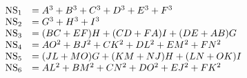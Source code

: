 \begin{equation*}
  \begin{array}{rl}
{\rm NS}_1 &= A^3 + B^3 +C^3 +D^3 + E^3 + F^3 \\
{\rm NS}_2 &= G^3 +H^3 +I^3 \\
{\rm NS}_3 &= (BC+EF)H+(CD+FA)I +(DE+AB)G \\
{\rm NS}_4 &= AO^2 +BJ^2 +CK^2 + DL^2 + EM^2 +FN^2 \\
{\rm NS}_5 &= (JL+MO)G + (KM+NJ)H +(LN+OK)I \\
{\rm NS}_6 &= AL^2+BM^2+CN^2+DO^2+EJ^2+FK^2 
  \end{array}
\end{equation*}

